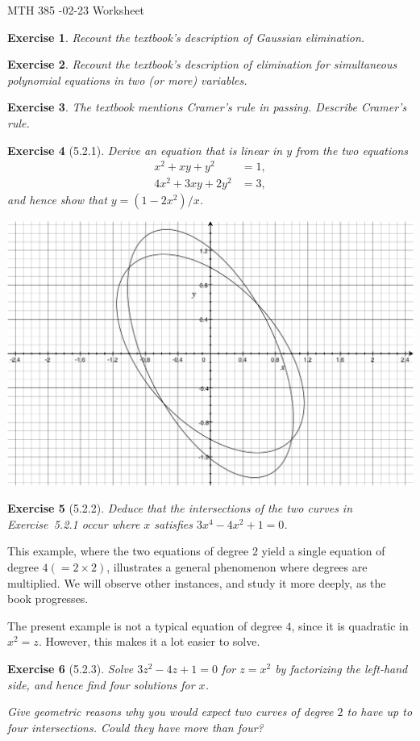 \documentclass[12pt]{article}
\theoremstyle{plain}
\newtheorem{ex}{Exercise}
\begin{document}
MTH 385 -02-23 Worksheet

\begin{ex}
  Recount the textbook's description of \emph{Gaussian elimination}.
\end{ex}

\begin{ex}
  Recount the textbook's description of elimination for simultaneous polynomial equations in two (or more) variables.
\end{ex}

\begin{ex}
  The textbook mentions Cramer's rule in passing. Describe Cramer's rule.
\end{ex}

\begin{ex} [5.2.1]
  Derive an equation that is linear in $y$ from the two equations
  \begin{align*}
    x^2+xy+y^2    &= 1, \\
    4x^2+3xy+2y^2 &= 3,
  \end{align*}
  and hence show that $y=(1-2x^2)/x$.
\end{ex}

\begin{center}
\includegraphics[scale=0.5]{curves}
\end{center}

\begin{ex} [5.2.2]
  Deduce that the intersections of the two curves in Exercise~5.2.1 occur where $x$ satisfies $3x^4-4x^2 +1=0$.
\end{ex}

This example, where the two equations of degree $2$ yield a single equation of degree $4(=2\times2)$, illustrates a general phenomenon where degrees are multiplied. We will observe other instances, and study it more deeply, as the book progresses.

The present example is not a typical equation of degree $4$, since it is quadratic in $x^2 = z$. However, this makes it a lot easier to solve.

\begin{ex} [5.2.3]
  Solve $3z^2-4z+1=0$ for $z=x^2$ by factorizing the left-hand side, and hence find four solutions for $x$.

  Give geometric reasons why you would expect two curves of degree $2$ to have up to four intersections. Could they have more than four?
\end{ex}
\end{document}
